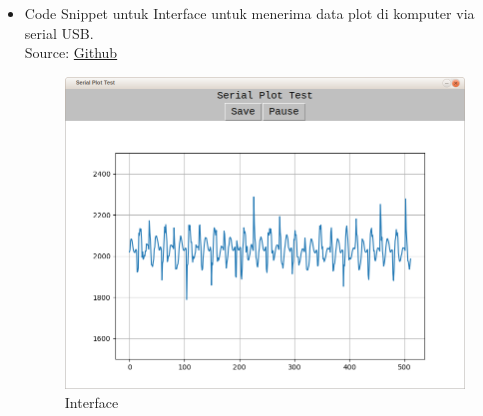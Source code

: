 \documentclass{book} %
\begin{document}
\begin{itemize}
		\begin{verbatim}
if(adcp->state == ADC_COMPLETE){
	sum_adc_tps = 0;
	
	for(i=0;i<ADC_GRP1_BUF_DEPTH;i++){
		sum_adc_tps = sum_adc_tps + samples[0 + (i*ADC_GRP1_NUM_CHANNELS)];
	}
	
	adc_z = sum_adc_tps/10;
	
	chprintf((BaseSequentialStream*)&SD1,"%4i\r\n",adc_z);
}
		\end{verbatim}
		
		\begin{verbatim}
static THD_WORKING_AREA(wa_adcThread, 128);
static THD_FUNCTION(adcThread, arg) {
	(void)arg;
	while (TRUE) {
		chThdSleepMicroseconds(125);
		adcStartConversion(&ADCD1, &adcgrpcfg, samples, ADC_GRP1_BUF_DEPTH);
	}
}
		\end{verbatim}
		
		\begin{verbatim}
palSetPadMode(GPIOA, 0, PAL_MODE_INPUT_ANALOG);

adcStart(&ADCD1, NULL);
chThdCreateStatic(wa_adcThread, sizeof(wa_adcThread), NORMALPRIO, adcThread, NULL);

palSetPadMode(GPIOA, 9, PAL_MODE_STM32_ALTERNATE_PUSHPULL);
palSetPadMode(GPIOA, 10, PAL_MODE_INPUT);

sdStart(&SD1, NULL);
		\end{verbatim}

	\newpage
	
	\item Code Snippet untuk Interface untuk menerima data plot di komputer via serial USB.\\
	Source: \href{https://github.com/VibrasticLab/wesel_monitoring/blob/master/interface/python/plot_test/serialplot.py}{Github} 
	
	\begin{figure}[!ht]
		\centering
		\includegraphics[width=\textwidth]{images/protoiface.png}
		\caption{Interface}
	\end{figure}
	\end{itemize}
	
\end{document}
